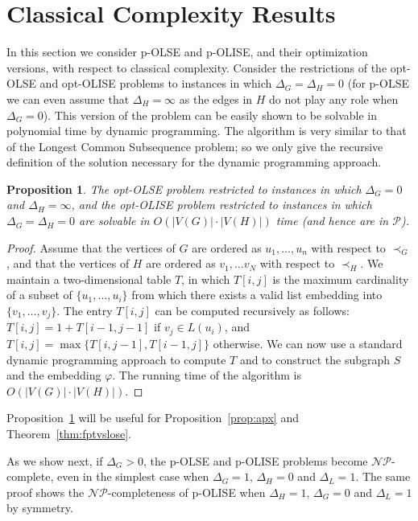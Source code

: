 \documentclass[11pt]{article}
\newtheorem{proposition}[theorem]{Proposition}
\newcommand{\Pol}{\mbox{$\mathcal P$}}
\newcommand{\NP}{\mbox{$\mathcal{NP}$}}
\let\phi=\varphi
\begin{document}
\section{Classical Complexity Results}\label{sec:complexity}
In this section we consider p-OLSE and p-OLISE, and their optimization versions, with respect to classical complexity. Consider the restrictions of the opt-OLSE and opt-OLISE problems to instances in which $\Delta_G = \Delta_H=0$ (for p-OLSE we can even assume that $\Delta_H = \infty$ as the edges in $H$ do not play any role when $\Delta_G=0$). This version of the problem can be easily shown to be solvable in polynomial time by dynamic programming. The algorithm is very similar to that of the {\sc Longest Common Subsequence} problem; so we only give the recursive definition of the solution necessary for the dynamic programming approach.

\begin{proposition}\label{prop:noedges}
The opt-OLSE problem restricted to instances in which $\Delta_G=0$ and  $\Delta_H=\infty$, and the opt-OLISE problem restricted to instances in which $\Delta_G= \Delta_H=0$ are solvable in $O(|V(G)| \cdot |V(H)|)$ time (and hence are in $\Pol$).
\end{proposition}

\begin{proof}
Assume that the vertices of $G$ are ordered as $u_1, \ldots, u_n$ with respect to $\prec_G$, and that the vertices of $H$ are ordered as $v_1, \ldots v_N$ with respect to $\prec_H$.
We maintain a two-dimensional table $T$, in which $T[i, j]$ is the maximum cardinality of a subset of $\{u_1, \ldots, u_i\}$ from which there exists a valid list embedding into $\{v_1, \ldots, v_j\}$. The entry $T[i, j]$ can be computed recursively as follows: $T[i, j] = 1+ T[i-1, j-1]$ if $v_j \in L(u_i)$, and $T[i, j] = \max\{T[i, j-1], T[i-1, j]\}$ otherwise. We can now use a standard dynamic programming approach to compute $T$ and to construct the subgraph $S$ and the embedding $\phi$. The running time of the algorithm is $O(|V(G)| \cdot |V(H)|)$.
\end{proof}

Proposition~\ref{prop:noedges} will be useful for Proposition~\ref{prop:apx} and Theorem~\ref{thm:fptvslose}.

As we show next, if $\Delta_G > 0$, the p-OLSE and p-OLISE problems become $\NP$-complete, even in the simplest case when $\Delta_G=1$, $\Delta_H=0$ and $\Delta_L =1$. The same proof shows the \NP-completeness
of p-OLISE when $\Delta_H=1$, $\Delta_G=0$ and $\Delta_L =1$ by symmetry.
\end{document}
